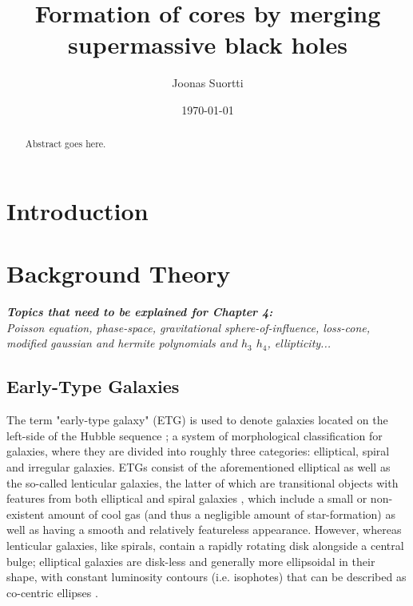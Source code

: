 \documentclass[english, oneside]{HYgradu}
\title{Formation of cores by merging supermassive black holes}
\author{Joonas Suortti}
\date{\today}
\begin{document}
\maketitle

\doublespacing

\begin{abstract}
Abstract goes here.
\end{abstract}

\mytableofcontents



\chapter{Introduction}

\chapter{Background Theory}

\textit{\textbf{Topics that need to be explained for Chapter 4:}
\\
Poisson equation, phase-space, gravitational sphere-of-influence, loss-cone, modified gaussian and hermite polynomials and $h_3$ $h_4$, ellipticity...}

\section{Early-Type Galaxies}

The term "early-type galaxy" (ETG) is used to denote galaxies located on the left-side of  the Hubble sequence \citep[defined by][]{Hubble1926}; a system of morphological classification for galaxies, where they are divided into roughly three categories: elliptical, spiral and irregular galaxies. ETGs consist of the aforementioned elliptical as well as the so-called lenticular galaxies, the latter of which are transitional objects with features from both elliptical and spiral galaxies \citep{BinneyTremaine}, which include a small or non-existent amount of cool gas (and thus a negligible amount of star-formation) as well as having a smooth and relatively featureless appearance. However, whereas lenticular galaxies, like spirals, contain a rapidly rotating disk alongside a central bulge; elliptical galaxies are disk-less and generally more ellipsoidal in their shape, with constant luminosity contours (i.e. isophotes) that can be described as co-centric ellipses \citep{BinneyTremaine}.
\end{document}
